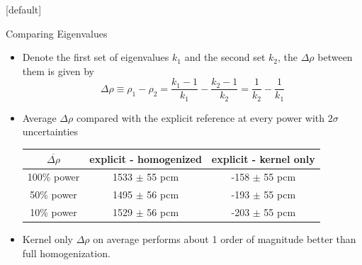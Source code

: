 \documentclass[9pt,t,aspectratio=169]{beamer}
\makeatletter
\newenvironment{withoutheadline}{
       \setbeamertemplate{headline}[default]
       \def\beamer@entrycode{\vspace*{-\headheight}}
    }{}
\makeatother
\begin{document}
\begin{withoutheadline}
\begin{frame}{Comparing Eigenvalues}
    \pause
    \Large
    \begin{itemize}
        \item<2-> Denote the first set of eigenvalues $k_ 1$ and the second set $k_2$, the $\Delta \rho$ between them is given by
        \begin{equation}
            \Delta \rho \equiv
            \rho_1 - \rho_2 =
            \frac{k_1-1}{k_1} - \frac{k_2 - 1 }{k_2} =
            \frac{1}{k_2} - \frac{1}{k_1}
        \end{equation}
        \item<3-> Average $\Delta \rho$ compared with the explicit reference at every power with $2\sigma$ uncertainties
        \begin{table}[!h]
            \centering
            \begin{tabular}{c|c|c}
            $\overline{\Delta \rho}$ & explicit - homogenized & explicit - kernel only \\ \hline
            100\% power & 1533 $\pm$ 55 pcm &  -158 $\pm$ 55 pcm \\
            50\% power & 1495 $\pm$ 56 pcm & -193 $\pm$ 55 pcm\\
            10\% power & 1529 $\pm$ 56 pcm  & -203 $\pm$ 55 pcm
            \end{tabular}
            \label{tab:average_pcms}
        \end{table}
    \item<4-> Kernel only $\Delta \rho$ on average performs about 1 order of magnitude better than full homogenization.
    \end{itemize}
    \normalsize
\end{frame}
\end{withoutheadline}

\end{document}
